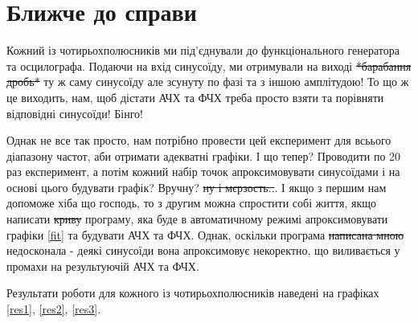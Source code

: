 \chapter{Ближче до справи} 
\label{chapter:first}

Кожний із чотирьохполюсників ми під'єднували до функціонального генератора та осцилографа. Подаючи на вхід синусоїду, ми отримували на виході \sout{*барабання дробь*} ту ж саму синусоїду але зсунуту по фазі та з іншою амплітудою! То що ж це виходить, нам, щоб дістати АЧХ та ФЧХ треба просто взяти та порівняти відповідні синусоїди! Бінго!

Однак не все так просто, нам потрібно провести цей експеримент для всьього діапазону частот, аби отримати адекватні графіки. І що тепер? Проводити по 20 раз експеримент, а потім кожний набір точок апроксимовувати синусоїдами і на основі цього будувати графік? Вручну? \sout{ну і мєрзость..}. І якщо з першим нам допоможе хіба що господь, то з другим можна спростити собі життя, якщо написати \sout{криву} програму, яка буде в автоматичному режимі апроксимовувати графіки \ref{fit} та будувати АЧХ та ФЧХ. Однак, оскільки програма \sout{написана мною} недосконала - деякі синусоїди вона апроксимовує некоректно, що виливається у промахи на результуючій АЧХ та ФЧХ.

Результати роботи для кожного із чотирьохполюсників наведені на графіках \ref{res1}, \ref{res2}, \ref{res3}. 

